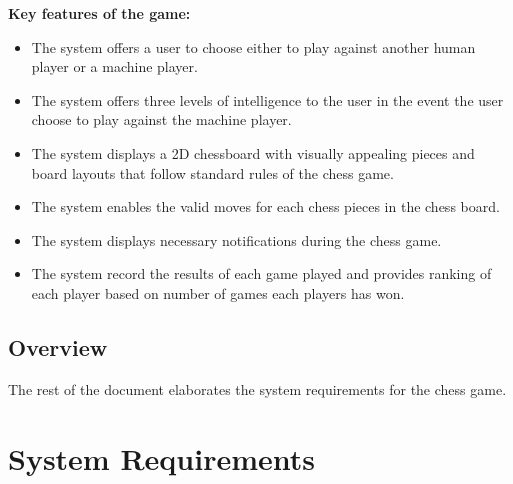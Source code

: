 \documentclass{article}
\begin{document}
	\textbf{Key features of the game:}
	\begin{itemize}
		\item The system offers a user to choose either to play against another human player or a machine player.
		\item The system offers three levels of intelligence to the user in the event the user choose to play against the machine player.
		\item The system displays a 2D chessboard with visually appealing pieces and board layouts that follow standard rules of the chess game.
		\item The system enables the valid moves for each chess pieces in the chess board.
		\item The system displays necessary notifications during the chess game.   
		\item The system record the results of each game played and provides ranking of each player based on number of games each players has won.
	\end{itemize}

\subsection{Overview}
The rest of the document elaborates the system requirements for the chess game.

\section{System Requirements}
\end{document}
